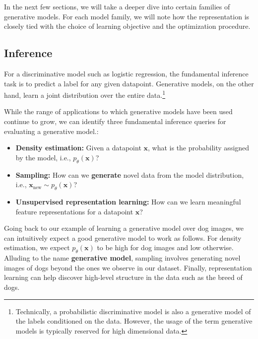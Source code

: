 In the next few sections, we will take a deeper dive into certain
families of generative models. For each model family, we will note how
the representation is closely tied with the choice of learning objective
and the optimization procedure.


\subsection{Inference}

For a discriminative model such as logistic regression, the fundamental
inference task is to predict a label for any given datapoint. Generative
models, on the other hand, learn a joint distribution over the entire
data.\footnote{Technically, a probabilistic discriminative model is also a
    generative model of the labels conditioned on the data. However, the
    usage of the term generative models is typically reserved for high
    dimensional data.}

While the range of applications to which generative models have been
used continue to grow, we can identify three fundamental inference
queries for evaluating a generative model.:

\begin{itemize}
\setlength{\parskip}{0pt}
\item[1.]
{\bf Density estimation:} Given a datapoint $\mathbf{x}$, what is the
    probability assigned by the model, i.e., $p_\theta(\mathbf{x})$?

\item[2.]
{\bf Sampling:} How can we {\bf generate} novel data from the model
    distribution, i.e.,
    $\mathbf{x}_{\mathrm{new}} \sim p_\theta(\mathbf{x})$?

\item[3.]
{\bf Unsupervised representation learning:} How can we learn meaningful
    feature representations for a datapoint $\mathbf{x}$?
\end{itemize}

Going back to our example of learning a generative model over dog
images, we can intuitively expect a good generative model to work as
follows. For density estimation, we expect $p_\theta(\mathbf{x})$ to be
high for dog images and low otherwise. Alluding to the name {\bf generative
model}, sampling involves generating novel images of dogs beyond the
ones we observe in our dataset. Finally, representation learning can
help discover high-level structure in the data such as the breed of
dogs.

